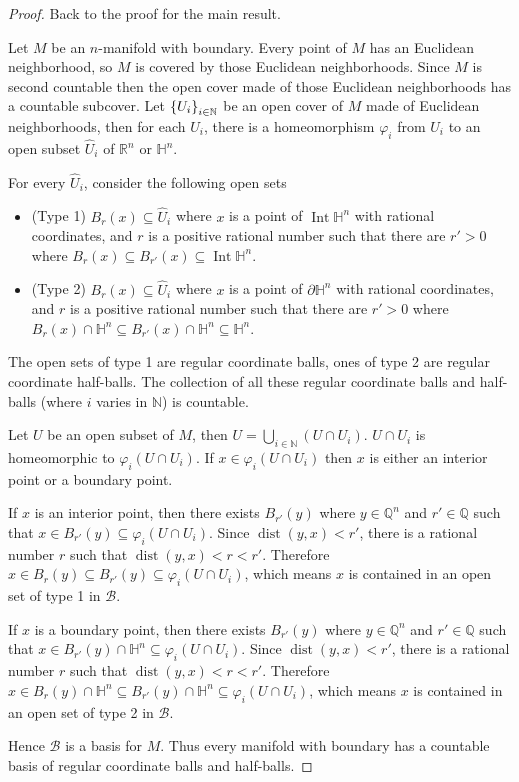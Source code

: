 \begin{proof}
	Back to the proof for the main result.

	Let $M$ be an $n$-manifold with boundary. Every point of $M$ has an Euclidean neighborhood, so $M$ is covered by those Euclidean neighborhoods. Since $M$ is second countable then the open cover made of those Euclidean neighborhoods has a countable subcover. Let $\left\{{U_{i}}\right\}_{i\in\mathbb{N}}$ be an open cover of $M$ made of Euclidean neighborhoods, then for each $U_{i}$, there is a homeomorphism $\varphi_{i}$ from $U_{i}$ to an open subset $\widehat{U}_{i}$ of $\mathbb{R}^{n}$ or $\mathbb{H}^{n}$.

	For every $\widehat{U}_{i}$, consider the following open sets
	\begin{itemize}
		\item (Type 1) $B_{r}(x) \subseteq \widehat{U}_{i}$ where $x$ is a point of $\operatorname{Int}\mathbb{H}^{n}$ with rational coordinates, and $r$ is a positive rational number such that there are $r' > 0$ where $B_{r}(x) \subseteq B_{r'}(x) \subseteq \operatorname{Int}\mathbb{H}^{n}$.
		\item (Type 2) $B_{r}(x) \subseteq \widehat{U}_{i}$ where $x$ is a point of $\partial\mathbb{H}^{n}$ with rational coordinates, and $r$ is a positive rational number such that there are $r' > 0$ where $B_{r}(x) \cap \mathbb{H}^{n} \subseteq B_{r'}(x) \cap \mathbb{H}^{n} \subseteq \mathbb{H}^{n}$.
	\end{itemize}

	The open sets of type 1 are regular coordinate balls, ones of type 2 are regular coordinate half-balls. The collection of all these regular coordinate balls and half-balls (where $i$ varies in $\mathbb{N}$) is countable.

	Let $U$ be an open subset of $M$, then $U = \bigcup_{i\in\mathbb{N}}(U\cap U_{i})$. $U\cap U_{i}$ is homeomorphic to $\varphi_{i}(U\cap U_{i})$. If $x \in \varphi_{i}(U\cap U_{i})$ then $x$ is either an interior point or a boundary point.

	If $x$ is an interior point, then there exists $B_{r'}(y)$ where $y\in\mathbb{Q}^{n}$ and $r'\in\mathbb{Q}$ such that $x \in B_{r'}(y) \subseteq \varphi_{i}(U\cap U_{i})$. Since $\operatorname{dist}(y, x) < r'$, there is a rational number $r$ such that $\operatorname{dist}(y, x) < r < r'$. Therefore $x \in B_{r}(y) \subseteq B_{r'}(y) \subseteq \varphi_{i}(U\cap U_{i})$, which means $x$ is contained in an open set of type 1 in $\mathscr{B}$.

	If $x$ is a boundary point, then there exists $B_{r'}(y)$ where $y\in\mathbb{Q}^{n}$ and $r'\in\mathbb{Q}$ such that $x \in B_{r'}(y) \cap \mathbb{H}^{n} \subseteq \varphi_{i}(U\cap U_{i})$. Since $\operatorname{dist}(y, x) < r'$, there is a rational number $r$ such that $\operatorname{dist}(y, x) < r < r'$. Therefore $x \in B_{r}(y) \cap \mathbb{H}^{n} \subseteq B_{r'}(y) \cap \mathbb{H}^{n} \subseteq \varphi_{i}(U\cap U_{i})$, which means $x$ is contained in an open set of type 2 in $\mathscr{B}$.

	Hence $\mathscr{B}$ is a basis for $M$. Thus every manifold with boundary has a countable basis of regular coordinate balls and half-balls.
\end{proof}

